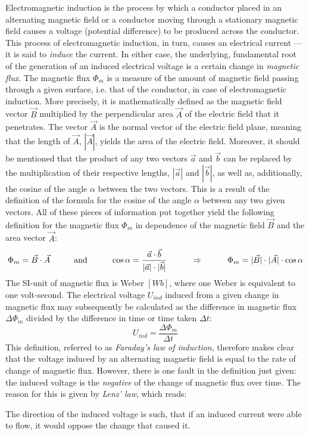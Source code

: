 Electromagnetic induction is the process by which a conductor placed in an alternating magnetic field or a conductor moving through a stationary magnetic field causes a voltage (potential difference) to be produced across the conductor. This process of electromagnetic induction, in turn, causes an electrical current --- it is said to \emph{induce} the current. In either case, the underlying, fundamental root of the generation of an induced electrical voltage is a certain change in \emph{magnetic flux}. The magnetic flux $\Phi_m$ is a measure of the amount of magnetic field passing through a given surface, i.e. that of the conductor, in case of electromagnetic induction. More precisely, it is mathematically defined as the magnetic field vector $\vec{B}$ multiplied by the perpendicular area $\vec{A}$ of the electric field that it penetrates. The vector $\vec{A}$ is the normal vector of the electric field plane, meaning that the length of $\vec{A}$, $|\vec{A}|$, yields the area of the electric field. Moreover, it should be mentioned that the product of any two vectors $\vec{a}$ and $\vec{b}$ can be replaced by the multiplication of their respective lengths, $|\vec{a}|$ and $|\vec{b}|$, as well as, additionally, the cosine of the angle $\alpha$ between the two vectors. This is a result of the definition of the formula for the cosine of the angle $\alpha$ between any two given vectors. All of these pieces of information put together yield the following definition for the magnetic flux $\Phi_m$ in dependence of the magnetic field $\vec{B}$ and the area vector $\vec{A}$: $$\Phi_m = \vec{B} \cdot \vec{A} \hspace{1 cm} \text{and} \hspace{1 cm} \cos \alpha = \frac{\vec{a} \cdot \vec{b}}{|\vec{a}| \cdot |\vec{b}|} \hspace{1 cm} \Rightarrow \hspace{1 cm} \Phi_m = |\vec{B}| \cdot |\vec{A}| \cdot \cos \alpha$$ The SI-unit of magnetic flux is Weber $[Wb]$, where one Weber is equivalent to one volt-second. The electrical voltage $U_{ind}$ induced from a given change in magnetic flux may subsequently be calculated as the difference in magnetic flux $\Delta \Phi_m$ divided by the difference in time or time taken $\Delta t$: $$U_{ind} = \frac{\Delta \Phi_m}{\Delta t}$$ This definition, referred to as \emph{Faraday's law of induction}, therefore makes clear that the voltage induced by an alternating magnetic field is equal to the rate of change of magnetic flux. However, there is one fault in the definition just given: the induced voltage is the \emph{negative} of the change of magnetic flux over time. The reason for this is given by \emph{Lenz' law}, which reads:

\begin{displayquote}

	The direction of the induced voltage is such, that if an induced current were able to flow, it would oppose the change that caused it.

\end{displayquote}

